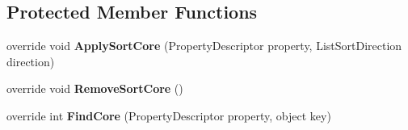 \subsection*{Protected Member Functions}
\begin{DoxyCompactItemize}
\item 
override void {\bfseries Apply\+Sort\+Core} (Property\+Descriptor property, List\+Sort\+Direction direction)\hypertarget{class_products_1_1_common_1_1_sortable_binding_list_a7f9af0add8fe11c168660075f2788e8f}{}\label{class_products_1_1_common_1_1_sortable_binding_list_a7f9af0add8fe11c168660075f2788e8f}

\item 
override void {\bfseries Remove\+Sort\+Core} ()\hypertarget{class_products_1_1_common_1_1_sortable_binding_list_afed7ef7f83c5954dd2c8e1dbf96ba6bb}{}\label{class_products_1_1_common_1_1_sortable_binding_list_afed7ef7f83c5954dd2c8e1dbf96ba6bb}

\item 
override int {\bfseries Find\+Core} (Property\+Descriptor property, object key)\hypertarget{class_products_1_1_common_1_1_sortable_binding_list_a722fb1c7ac6efef60d8cf2ac0ba32ff6}{}\label{class_products_1_1_common_1_1_sortable_binding_list_a722fb1c7ac6efef60d8cf2ac0ba32ff6}

\end{DoxyCompactItemize}
